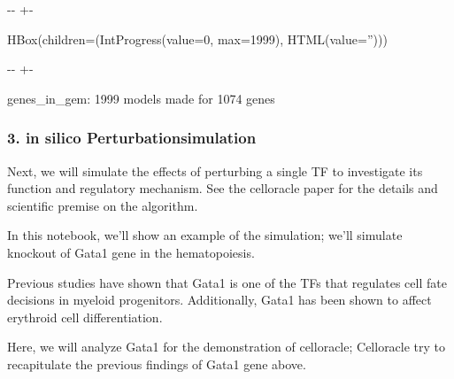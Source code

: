 \documentclass[letterpaper,10pt,english]{sphinxmanual}
\newlength\nbsphinxcodecellspacing
\begin{document}
{

\kern-\sphinxverbatimsmallskipamount\kern-\baselineskip
\kern+\FrameHeightAdjust\kern-\fboxrule
\vspace{\nbsphinxcodecellspacing}

\begin{sphinxVerbatim}[commandchars=\\\{\}]
HBox(children=(IntProgress(value=0, max=1999), HTML(value='')))
\end{sphinxVerbatim}
}

{

\kern-\sphinxverbatimsmallskipamount\kern-\baselineskip
\kern+\FrameHeightAdjust\kern-\fboxrule
\vspace{\nbsphinxcodecellspacing}

\begin{sphinxVerbatim}[commandchars=\\\{\}]

genes\_in\_gem: 1999
models made for 1074 genes
\end{sphinxVerbatim}
}


\subsubsection{3. in silico Perturbation\sphinxhyphen{}simulation}
\label{\detokenize{notebooks/05_simulation/Gata1_KO_simulation_with_Paul_etal_2015_data:3.-in-silico-Perturbation-simulation}}
Next, we will simulate the effects of perturbing a single TF to investigate its function and regulatory mechanism. See the celloracle paper for the details and scientific premise on the algorithm.

In this notebook, we’ll show an example of the simulation; we’ll simulate knock\sphinxhyphen{}out of Gata1 gene in the hematopoiesis.

Previous studies have shown that Gata1 is one of the TFs that regulates cell fate decisions in myeloid progenitors. Additionally, Gata1 has been shown to affect erythroid cell differentiation.

Here, we will analyze Gata1 for the demonstration of celloracle; Celloracle try to recapitulate the previous findings of Gata1 gene above.
\end{document}
